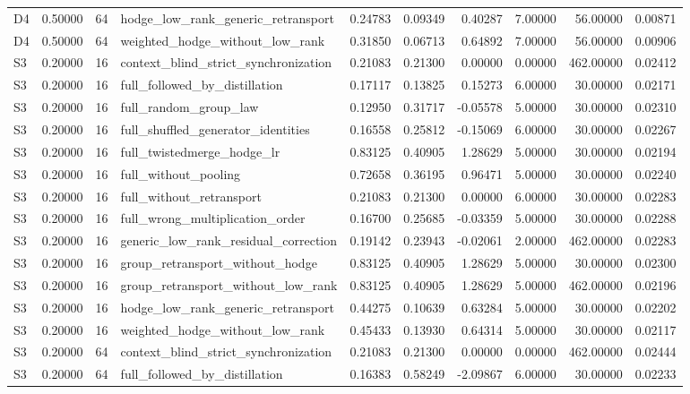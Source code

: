 \begin{tabular}{lrrlrrrrrr}
D4 & 0.50000 & 64 & hodge_low_rank_generic_retransport & 0.24783 & 0.09349 & 0.40287 & 7.00000 & 56.00000 & 0.00871 \\
D4 & 0.50000 & 64 & weighted_hodge_without_low_rank & 0.31850 & 0.06713 & 0.64892 & 7.00000 & 56.00000 & 0.00906 \\
S3 & 0.20000 & 16 & context_blind_strict_synchronization & 0.21083 & 0.21300 & 0.00000 & 0.00000 & 462.00000 & 0.02412 \\
S3 & 0.20000 & 16 & full_followed_by_distillation & 0.17117 & 0.13825 & 0.15273 & 6.00000 & 30.00000 & 0.02171 \\
S3 & 0.20000 & 16 & full_random_group_law & 0.12950 & 0.31717 & -0.05578 & 5.00000 & 30.00000 & 0.02310 \\
S3 & 0.20000 & 16 & full_shuffled_generator_identities & 0.16558 & 0.25812 & -0.15069 & 6.00000 & 30.00000 & 0.02267 \\
S3 & 0.20000 & 16 & full_twistedmerge_hodge_lr & 0.83125 & 0.40905 & 1.28629 & 5.00000 & 30.00000 & 0.02194 \\
S3 & 0.20000 & 16 & full_without_pooling & 0.72658 & 0.36195 & 0.96471 & 5.00000 & 30.00000 & 0.02240 \\
S3 & 0.20000 & 16 & full_without_retransport & 0.21083 & 0.21300 & 0.00000 & 6.00000 & 30.00000 & 0.02283 \\
S3 & 0.20000 & 16 & full_wrong_multiplication_order & 0.16700 & 0.25685 & -0.03359 & 5.00000 & 30.00000 & 0.02288 \\
S3 & 0.20000 & 16 & generic_low_rank_residual_correction & 0.19142 & 0.23943 & -0.02061 & 2.00000 & 462.00000 & 0.02283 \\
S3 & 0.20000 & 16 & group_retransport_without_hodge & 0.83125 & 0.40905 & 1.28629 & 5.00000 & 30.00000 & 0.02300 \\
S3 & 0.20000 & 16 & group_retransport_without_low_rank & 0.83125 & 0.40905 & 1.28629 & 5.00000 & 462.00000 & 0.02196 \\
S3 & 0.20000 & 16 & hodge_low_rank_generic_retransport & 0.44275 & 0.10639 & 0.63284 & 5.00000 & 30.00000 & 0.02202 \\
S3 & 0.20000 & 16 & weighted_hodge_without_low_rank & 0.45433 & 0.13930 & 0.64314 & 5.00000 & 30.00000 & 0.02117 \\
S3 & 0.20000 & 64 & context_blind_strict_synchronization & 0.21083 & 0.21300 & 0.00000 & 0.00000 & 462.00000 & 0.02444 \\
S3 & 0.20000 & 64 & full_followed_by_distillation & 0.16383 & 0.58249 & -2.09867 & 6.00000 & 30.00000 & 0.02233 \\

\end{tabular}
